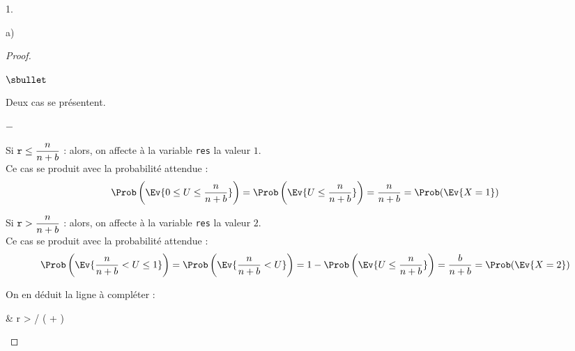 \documentclass[11pt]{article}%
\begin{document}
\begin{noliste}{1.}
\begin{noliste}{a)}
\begin{proof}
\begin{noliste}{$\sbullet$}
\begin{center}
        \end{center}
        Deux cas se présentent.
        \begin{noliste}{$-$}
        \item Si $\text{\tt r} \leq \dfrac{n}{n+b}$ : alors, on
          affecte à la variable {\tt res} la valeur $1$.\\
          Ce cas se produit avec la probabilité attendue :
          \[
          \Prob\left( \Ev{0 \leq U \leq \frac{n}{n+b}} \right) =
          \Prob\left( \Ev{U \leq \frac{n}{n+b}} \right) =
          \dfrac{n}{n+b} = \Prob(\Ev{X = 1})
          \]


          \newpage


        \item Si $\text{\tt r} > \dfrac{n}{n+b}$ : alors, on
          affecte à la variable {\tt res} la valeur $2$.\\
          Ce cas se produit avec la probabilité attendue :
          \[
          \Prob\left( \Ev{\frac{n}{n+b} < U \leq 1} \right) =
          \Prob\left( \Ev{\frac{n}{n+b} < U} \right) = 1 -
          \Prob\left(\Ev{U \leq \frac{n}{n+b}} \right) =
          \dfrac{b}{n+b} = \Prob(\Ev{X = 2})
          \]

        \end{noliste}    

      \item On en déduit la ligne  à compléter :
        \begin{scilabC}{2}
          & \quad {} r >  / ( + )
           \nl %
        \end{scilabC}        
      \end{noliste}
 

\end{proof}
\end{noliste}
\end{noliste}
\end{document}
